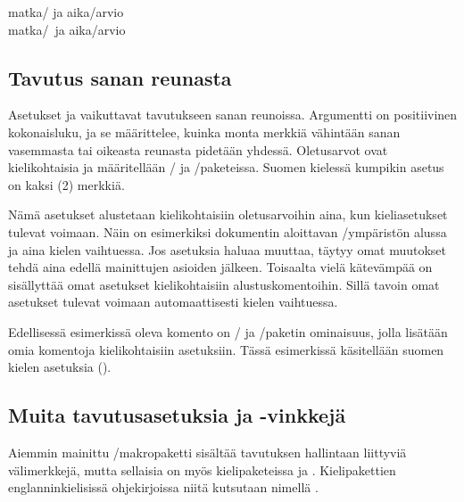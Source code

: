 \begin{tulossis}
  matka\-/{} ja aika\-/arvio \\
  matka\-/\ ja aika\-/arvio
\end{tulossis}

\subsection{Tavutus sanan reunasta}

Asetukset  ja  vaikuttavat tavutukseen sanan reunoissa.
Argumentti  on positiivinen kokonaisluku, ja se määrittelee,
kuinka monta merkkiä vähintään sanan vasemmasta tai oikeasta reunasta
pidetään yhdessä. Oletus\-arvot ovat kielikohtaisia ja määritellään
\-/{} ja \-/paketeissa. Suomen
kielessä kumpikin asetus on kaksi (2) merkkiä.

Nämä asetukset alustetaan kielikohtaisiin oletusarvoihin aina, kun
kieliasetukset tulevat voimaan. Näin on esimerkiksi dokumentin
aloittavan \-/ympäristön alussa ja aina kielen
vaihtuessa. Jos asetuksia ha\-luaa muuttaa, täytyy omat muutokset tehdä
aina edellä mainittujen asioiden jälkeen. Toisaalta vielä kätevämpää on
sisällyttää omat asetukset kielikohtaisiin alustuskomentoihin. Sillä
tavoin omat asetukset tulevat voimaan automaattisesti kielen vaihtuessa.

\begin{koodilohkosis}
\end{koodilohkosis}

Edellisessä esimerkissä oleva komento  on
\-/{} ja \-/paketin ominaisuus,
jolla lisätään omia komentoja kielikohtaisiin asetuksiin. Tässä
esimerkissä käsitellään suomen kielen asetuksia ().

\subsection{Muita tavutusasetuksia ja -vinkkejä}
\label{luku:tavutus_muut}

Aiemmin mainittu \-/makropaketti sisältää tavutuksen
hallintaan liittyviä välimerkkejä, mutta sellaisia on myös
kielipaketeissa  ja . Kielipakettien
englanninkielisissä ohjekirjoissa niitä kutsutaan nimellä
\emph{}.

